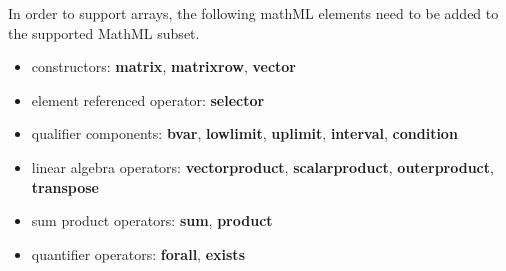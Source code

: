 In order to support arrays, the following mathML elements need to be added to the supported MathML subset. 
\begin{itemize}
\item constructors: {\bf matrix}, {\bf matrixrow}, {\bf vector}
\item element referenced operator: {\bf selector}
\item qualifier components: {\bf bvar}, {\bf lowlimit}, {\bf uplimit},  {\bf interval}, {\bf condition}
\item linear algebra operators: {\bf vectorproduct}, {\bf scalarproduct}, {\bf outerproduct}, {\bf transpose}
\item sum product operators: {\bf sum}, {\bf product}
\item quantifier operators: {\bf forall}, {\bf exists}
\end{itemize}

